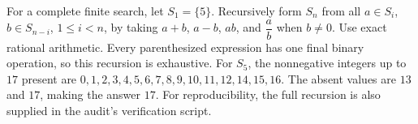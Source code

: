 For a complete finite search, let $S_1=\{5\}$. Recursively form $S_n$ from all $a\in S_i$, $b\in S_{n-i}$, $1\le i<n$, by taking $a+b$, $a-b$, $ab$, and $\dfrac{a}{b}$ when $b\ne0$. Use exact rational arithmetic. Every parenthesized expression has one final binary operation, so this recursion is exhaustive. For $S_5$, the nonnegative integers up to $17$ present are $0,1,2,3,4,5,6,7,8,9,10,11,12,14,15,16$. The absent values are $13$ and $17$, making the answer $\boxed{17}$. For reproducibility, the full recursion is also supplied in the audit's verification script.

